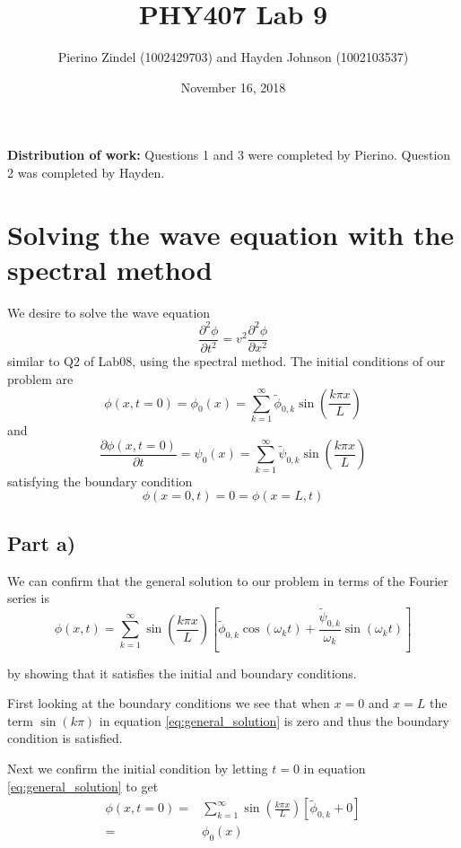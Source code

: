 \documentclass{article}
\title{PHY407 Lab 9}
\author{Pierino Zindel (1002429703) and Hayden Johnson (1002103537)}
\date{November 16, 2018}
\begin{document}
\maketitle

\noindent \textbf{Distribution of work:} Questions 1 and 3 were completed by Pierino. Question 2 was completed by Hayden.

\section{Solving the wave equation with the spectral method}
We desire to solve the wave equation 
\begin{equation}
	\label{eq:wave}
	\frac{\partial^2 \phi}{\partial t^2} = v^2 \frac{\partial^2 \phi}{\partial x^2}
\end{equation}
similar to Q2 of Lab08, using the spectral method. The initial conditions of our problem are 
\begin{equation}
\label{eq:phi_0}
	\phi (x,t=0) = \phi _0(x)= \sum^{\infty} _{k=1} \widetilde{ \phi } _{0,k} \sin ( \frac{k \pi x}{L})
\end{equation}
and 
\begin{equation}
\label{eq:psi_0}
	\frac{\partial \phi(x,t=0)}{\partial t} = \psi_0(x) = \sum^{\infty}_{k=1} \widetilde{\psi}_{0,k} \sin(\frac{k\pi x}{L})
\end{equation}
satisfying the boundary condition
\begin{equation}
	\phi(x=0,t)=0=\phi(x=L,t)
\end{equation}

\subsection{Part a)}
We can confirm that the general solution to our problem in terms of the Fourier series is 
\begin{equation}
	\label{eq:general_solution}
	\phi(x,t)= \sum^{\infty}_{k=1} \sin(\frac{k\pi x}{L}) \left[ \widetilde{\phi}_{0,k} \cos(\omega_k t) + \frac{\widetilde{\psi}_{0,k}}{\omega_k} \sin(\omega_k t) \right]
\end{equation}

by showing that it satisfies the initial and boundary conditions.

First looking at the boundary conditions we see that when $x=0$ and $x=L$ the term $\sin(k\pi)$ in equation \ref{eq:general_solution} is zero and thus the boundary condition is satisfied.

Next we confirm the initial condition by letting $t=0$ in equation \ref{eq:general_solution} to get 
\begin{equation}
\begin{split}
	\phi(x,t=0)=& \sum^{\infty}_{k=1} \sin(\frac{k\pi x}{L}) \left[\widetilde{\phi}_{0,k} + 0 \right]
	\\ =& \phi_0(x)
\end{split}
\end{equation}
\end{document}
